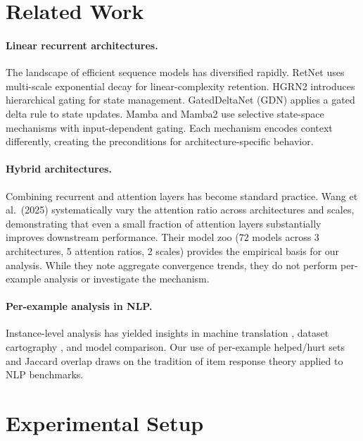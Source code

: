 \documentclass[11pt,a4paper]{article}
\begin{document}
\section{Related Work}

\paragraph{Linear recurrent architectures.}
The landscape of efficient sequence models has diversified rapidly.
RetNet \citep{sun2023retentive} uses multi-scale exponential decay for linear-complexity retention.
HGRN2 \citep{qin2024hgrn2} introduces hierarchical gating for state management.
GatedDeltaNet (GDN) applies a gated delta rule to state updates.
Mamba and Mamba2 \citep{gu2023mamba,dao2024mamba2} use selective state-space mechanisms with input-dependent gating.
Each mechanism encodes context differently, creating the preconditions for architecture-specific behavior.

\paragraph{Hybrid architectures.}
Combining recurrent and attention layers has become standard practice.
Wang et al.\ (2025) systematically vary the attention ratio across architectures and scales, demonstrating that even a small fraction of attention layers substantially improves downstream performance.
Their model zoo (72 models across 3 architectures, 5 attention ratios, 2 scales) provides the empirical basis for our analysis.
While they note aggregate convergence trends, they do not perform per-example analysis or investigate the mechanism.

\paragraph{Per-example analysis in NLP.}
Instance-level analysis has yielded insights in machine translation \citep{vilar2006error}, dataset cartography \citep{swayamdipta2020dataset}, and model comparison.
Our use of per-example helped/hurt sets and Jaccard overlap draws on the tradition of item response theory applied to NLP benchmarks.

\section{Experimental Setup}
\end{document}
